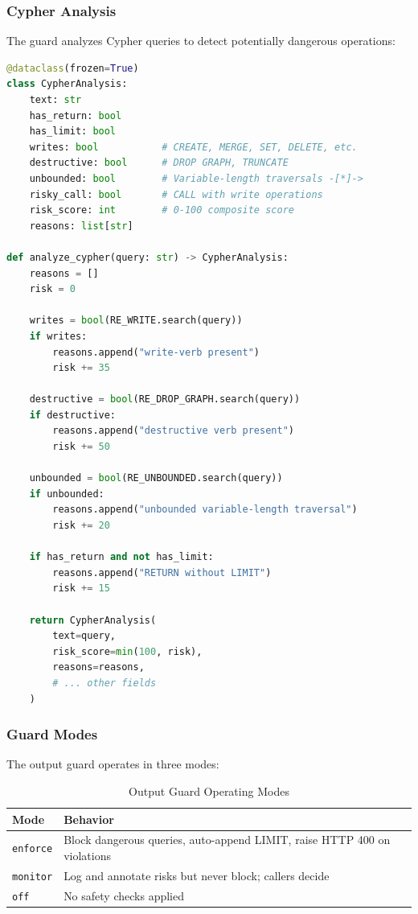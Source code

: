 \subsubsection{Cypher Analysis}

The guard analyzes Cypher queries to detect potentially dangerous operations:

\begin{lstlisting}[language=Python,caption={Cypher safety analysis}]
@dataclass(frozen=True)
class CypherAnalysis:
    text: str
    has_return: bool
    has_limit: bool
    writes: bool           # CREATE, MERGE, SET, DELETE, etc.
    destructive: bool      # DROP GRAPH, TRUNCATE
    unbounded: bool        # Variable-length traversals -[*]->
    risky_call: bool       # CALL with write operations
    risk_score: int        # 0-100 composite score
    reasons: list[str]

def analyze_cypher(query: str) -> CypherAnalysis:
    reasons = []
    risk = 0
    
    writes = bool(RE_WRITE.search(query))
    if writes:
        reasons.append("write-verb present")
        risk += 35
    
    destructive = bool(RE_DROP_GRAPH.search(query))
    if destructive:
        reasons.append("destructive verb present")
        risk += 50
    
    unbounded = bool(RE_UNBOUNDED.search(query))
    if unbounded:
        reasons.append("unbounded variable-length traversal")
        risk += 20
    
    if has_return and not has_limit:
        reasons.append("RETURN without LIMIT")
        risk += 15
    
    return CypherAnalysis(
        text=query,
        risk_score=min(100, risk),
        reasons=reasons,
        # ... other fields
    )
\end{lstlisting}

\subsubsection{Guard Modes}

The output guard operates in three modes:

\begin{table}[ht]
\centering
\caption{Output Guard Operating Modes}
\label{tab:output-guard-modes}
\begin{tabular}{lp{9cm}}
\hline
\textbf{Mode} & \textbf{Behavior} \\
\hline
\texttt{enforce} & Block dangerous queries, auto-append LIMIT, raise HTTP 400 on violations \\
\texttt{monitor} & Log and annotate risks but never block; callers decide \\
\texttt{off} & No safety checks applied \\
\hline
\end{tabular}
\end{table}

